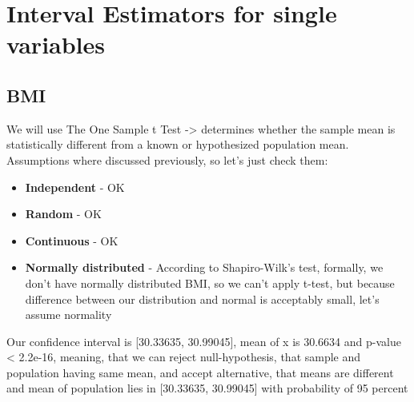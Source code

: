 \documentclass{article}
\begin{document}
\section{Interval Estimators for single variables}

\subsection{BMI}

We will use The One Sample t Test -> determines whether the sample mean is statistically different from a known or hypothesized population mean. Assumptions where discussed previously, so let's just check them:
\begin{itemize}
  \item \textbf{Independent} - OK
  \item \textbf{Random} - OK
  \item \textbf{Continuous} - OK
  \item \textbf{Normally distributed} - According to Shapiro-Wilk’s test, formally, we don't have normally distributed BMI, so we can't apply t-test, but because difference between our distribution and normal is acceptably small, let's assume normality
  \end{itemize}

\begin{Schunk}
\end{Schunk}
Our confidence interval is [30.33635, 30.99045], mean of x is 30.6634 and p-value < 2.2e-16, meaning, that we can reject null-hypothesis, that sample and population having same mean, and accept alternative, that means are different and mean of population lies in [30.33635, 30.99045] with probability of 95 percent
\end{document}
